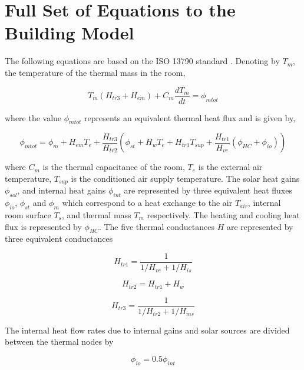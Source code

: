 \section{Full Set of Equations to the Building Model}

The following equations are based on the ISO 13790 standard \cite{de2008iso}. Denoting by $T_m$, the temperature of the thermal mass in the room,

\begin{equation} 
\label{eq:derrive2}
      T_m(H_{tr3}+H_{em}) + C_m {\frac{dT_m}{dt}} = \phi_{mtot}
\end{equation}

where the value $\phi_{mtot}$ represents an equivalent thermal heat flux and is given by,

\begin{equation} 
\label{eq:heatflow2}
      \phi_{mtot}= \phi_m + H_{em}T_e + \frac{H_{tr3}}{H_{tr2}}(\phi_{st} + H_wT_e + H_{tr1}T_{sup} + \frac{H_{tr1}}{H_{ve}}(\phi_{HC} + \phi_{io}))
\end{equation}

where $C_m$ is the thermal capacitance of the room, $T_e$ is the external air temperature, $T_{sup}$ is the conditioned air supply temperature. The solar heat gains $\phi_{sol}$, and internal heat gains $\phi_{int}$ are represented by three equivalent heat fluxes $\phi_{io}$, $\phi_{st}$ and $\phi_m$ which correspond to a heat exchange to the air $T_{air}$, internal room surface $T_s$, and thermal mass $T_m$ respectively. The heating and cooling heat flux is represented by $\phi_{HC}$. The five thermal conductances $H$ are represented by three equivalent conductances

\begin{equation} 
\label{eq:Htr12}
      H_{tr1}= \frac{1}{1/H_{ve} + 1/H_{is}}
\end{equation}

\begin{equation} 
\label{eq:Htr2}
      H_{tr2}= H_{tr1} + H_{w}
\end{equation}

\begin{equation} 
\label{eq:Htr32}
      H_{tr3}= \frac{1}{1/H_{tr2} + 1/H_{ms}}
\end{equation}

The internal heat flow rates due to internal gains and solar sources are divided between the thermal nodes by

\begin{equation} 
\label{eq:phi_ia2}
      \phi_{io}= 0.5\phi_{int}
\end{equation}

